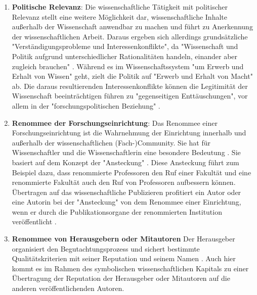 \begin{enumerate}
\item \textbf{Politische Relevanz}: Die wissenschaftliche Tätigkeit mit politischer Relevanz stellt eine weitere Möglichkeit dar, wissenschaftliche Inhalte außerhalb der Wissenschaft anwendbar zu machen und führt zu Anerkennung der wissenschaftlichen Arbeit. Daraus ergeben sich allerdings grundsätzliche "Verständigungsprobleme und Interessenkonflikte", da  "Wissenschaft und Politik aufgrund unterschiedlicher Rationalitäten handeln, einander aber zugleich brauchen" \cite{Mayntz_1996}. Während es im Wissenschaftssystem "um Erwerb und Erhalt von Wissen" geht, zielt die Politik auf "Erwerb und Erhalt von Macht" \cite{Mayntz_1996} ab. Die daraus resultierenden Interessenkonflikte können die Legitimität der Wissenschaft beeinträchtigen \cite{weingart_2005_wissenschaft} \cite[:494]{Weber_1992} führen zu "gegenseitigen Enttäuschungen", vor allem in der "forschungspolitischen Beziehung" \cite{Mayntz_1996}.
\item \textbf{Renommee der Forschungseinrichtung}: Das Renommee einer Forschungseinrichtung ist die Wahrnehmung der Einrichtung innerhalb und außerhalb der wissenschaftlichen (Fach-)Community. Sie hat für Wissenschaftler und die Wissenschaftlerin eine besondere Bedeutung \cite{mayntz_2008_wissensproduktion}. Sie basiert auf dem Konzept der "Ansteckung" \cite{luhmann_1970_selbststeuerung}. Diese Ansteckung führt zum Beispiel dazu, dass renommierte Professoren den Ruf einer Fakultät und eine renommierte Fakultät auch den Ruf von Professoren aufbessern können. Übertragen auf das wissenschaftliche Publizieren profitiert ein Autor oder eine Autorin bei der "Ansteckung" von dem Renommee einer Einrichtung, wenn er durch die Publikationsorgane der renommierten Institution veröffentlicht \cite{lutz_2012_zugang}.
\item \textbf{Renommee von Herausgebern oder Mitautoren} Der Herausgeber organisiert den Begutachtungsprozess und sichert bestimmte Qualitätskriterien mit seiner Reputation und seinem Namen \cite{mueller_2009_peerreview}. Auch hier kommt es im Rahmen des symbolischen wissenschaftlichen Kapitals zu einer Übertragung der Reputation der Herausgeber oder Mitautoren auf die anderen veröffentlichenden Autoren.

\end{enumerate}
